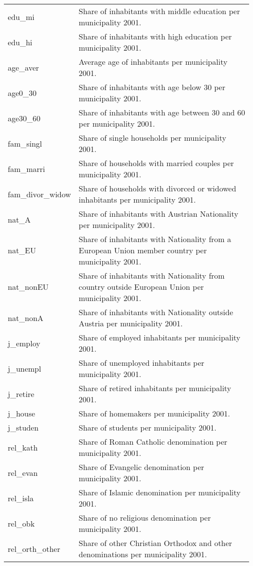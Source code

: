 \begin{longtable}[t]{l>{\raggedright\arraybackslash}p{30em}}
edu\_mi & Share of inhabitants with middle education per municipality 2001.\\
edu\_hi & Share of inhabitants with high education per municipality 2001.\\
age\_aver & Average age of inhabitants per municipality 2001.\\
age0\_30 & Share of inhabitants with age below 30 per municipality 2001.\\
\addlinespace
age30\_60 & Share of inhabitants with age between 30 and 60 per municipality 2001.\\
fam\_singl & Share of single households per municipality 2001.\\
fam\_marri & Share of households with married couples per municipality 2001.\\
fam\_divor\_widow & Share of households with divorced or widowed inhabitants per municipality 2001.\\
nat\_A & Share of inhabitants with Austrian Nationality per municipality 2001.\\
\addlinespace
nat\_EU & Share of inhabitants with Nationality from a European Union member country per municipality 2001.\\
nat\_nonEU & Share of inhabitants with Nationality from country outside European Union per municipality 2001.\\
nat\_nonA & Share of inhabitants with Nationality outside Austria per municipality 2001.\\
j\_employ & Share of employed inhabitants per municipality 2001.\\
j\_unempl & Share of unemployed inhabitants per municipality 2001.\\
\addlinespace
j\_retire & Share of retired inhabitants per municipality 2001.\\
j\_house & Share of homemakers per municipality 2001.\\
j\_studen & Share of students per municipality 2001.\\
rel\_kath & Share of Roman Catholic denomination per municipality 2001.\\
rel\_evan & Share of Evangelic denomination per municipality 2001.\\
\addlinespace
rel\_isla & Share of Islamic denomination per municipality 2001.\\
rel\_obk & Share of no religious denomination per municipality 2001.\\
rel\_orth\_other & Share of other Christian Orthodox and other denominations per municipality 2001.\\

\end{longtable}
